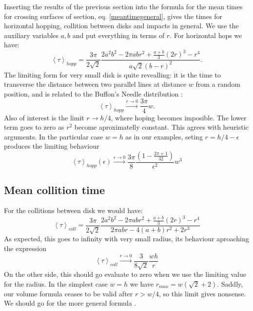 \documentclass[a4paper,10pt, jcp, aps, preprint]{revtex4-1}
\newcommand{\mean}[1]{\left \langle #1 \right \rangle}
\begin{document}
Inserting the results of the previous section 
into the formula for the mean times for crossing
surfaces of section, eq. \ref{meantimegeneral}, gives the times for 
horizontal hopping, 
collition between disks and impacts in general. We use the auxiliary
variables $a,b$ and put everything in terms of $r$. For horizontal
hops we have:
\begin{equation}\label{hoptau}
 \mean{\tau}_{hopp} = 	
\frac{3 \pi}{2\sqrt{2}}
\frac{2 a^{2} b^{2}  - 2 \pi a b r^{2} + \textstyle \frac{a+b}{3}  (2r)^{3}  -  r^4}
{ a \sqrt{2}  ( b - r )^2}.
\end{equation}
The limiting form for very small disk is quite revealling: it is the time
to transverse the distance between two parallel lines at distance $w$ from
a random position, and is related to the Buffon's Needle distribution 
\cite{EScheinerman}:
\begin{equation}\label{hoptaulimit}
 \mean{\tau}_{hopp} \xrightarrow{r\rightarrow 0} 	
\frac{3 \pi}{4}w.
\end{equation}
Also of interest is the limit $r\rightarrow h/4$, where hoping becomes
imposible. The lower term goes to zero as $r^2$ become aproximatelly constant.
This agrees with heuristic arguments. 
In the particular case $w=h$ as in our examples,
seting $r=h/4-\epsilon$ produces the limiting behaviour 
\begin{equation}
 \mean{\tau}_{hopp}(\epsilon) \xrightarrow{\epsilon\rightarrow 0} 	
\frac{3 \pi}{8}
\frac{(1-\frac{2\pi+1}{32})}
{ \epsilon^2} w^3
\end{equation} 

\subsection{Mean collition time}

For the collitions between disk we would have:
\begin{equation}\label{colltau}
 \mean{\tau}_{coll} = 	
\frac{3 \pi}{2\sqrt{2}}
\frac {2 a^{2} b^{2}  - 2 \pi a b r^{2} + \textstyle \frac{a+b}{3}  (2r)^{3}  -  r^4}
{2\pi a b r -4(a+b)r^2+2r^3}
\end{equation}
As expected, this goes to infinity with very small radius, its behaviour
aproaching the expression
\begin{equation}\label{colltaulim0}
\mean{\tau}_{coll}  \xrightarrow{r\rightarrow 0} 
\frac{3}{8\sqrt{2}}\frac{wh}{r}
\end{equation}
On the other side, this should go evaluate to zero when
we use the limiting value for the radius. In the simplest
case  $w = h$ we have $r_{max}= w(\sqrt{2}+2)$. Saddly, our volume
formula ceases to be valid after $r>w/4$, so this limit gives nonsense.
We should go for the more general formula \cite{notascalculokarel}.
\end{document}
